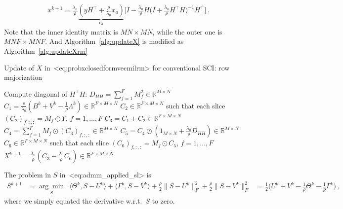 \documentclass[a4paper,11pt]{article}
\def\\{}%
\def\eqref#1{<#1>}%
\newcommand{\mypar}[1]{\bigskip\noindent {\bf #1.}}
\begin{document}
\begin{align}
  x^{k+1}
  =
  \frac{\lambda_0}{\rho}
  \underbrace{\left(y H^\top + \frac{\rho}{\lambda_0} x_a\right)}_{c_3}
  \bigg[
    I - \frac{\lambda_0}{\rho}
    H\big( I + \frac{\lambda_0}{\rho}H^\top H\big)^{-1}H^\top
  \bigg]\,.
  \label{eq:probxclosedformvecmilrm}
\end{align}
Note that the inner identity matrix is $MN \times MN$, while the outer one is
$MNF \times MNF$. And Algorithm~\ref{alg:updateX} is modified as
Algorithm~\ref{alg:updateXrm}
\begin{algorithm}
  \caption{Update of $X$ in~\eqref{eq:probxclosedformvecmilrm} for
  conventional SCI: row majorization}
  \label{alg:updateXrm}
  \begin{algorithmic}[1]
    \algrenewcommand{}
    \Require Compute diagonal of $H^\top H$: $D_{HH} = \sum_{f=1}^{F} M_f^2 \in \mathbb{R}^{M\times N}$
    \algrenewcommand{}
    \Require
    \State $C_1 = \frac{\rho}{\lambda_0} (B^k + V^k - \frac{1}{\rho}\Lambda^k) \in \mathbb{R}^{F\times M\times N}$
    \State $C_2 \in \mathbb{R}^{F\times M\times N}$ such that each slice
    $(C_2)_{f,:, :} = M_f \odot Y$, $f = 1, \ldots, F$
    \State $C_3 = C_1 + C_2 \in \mathbb{R}^{F\times M \times N}$
    \State $C_4 = \sum_{f=1}^{F} M_f \odot (C_3)_{f, :, :} \in \mathbb{R}^{M\times N}$
    \State $C_5 = C_4 \oslash (1_{M\times N} + \frac{\lambda_0}{\rho}D_{HH}) \in \mathbb{R}^{M\times N}$
    \label{subAlg:inversesteprm}
    \State $C_6 \in \mathbb{R}^{F\times M\times N}$ such that each slice
    $(C_6)_{f, :, :} = M_f \odot C_5$, $f = 1, \ldots, F$
    \State $X^{k+1} = \frac{\lambda_0}{\rho}(C_3 - \frac{\lambda_0}{\rho}C_6) \in \mathbb{R}^{F\times
    M\times N}$
  \end{algorithmic}
\end{algorithm}

\mypar{Updating $\bm{S}$}
The problem in $S$ in~\eqref{eq:admm_applied_sl} is
\begin{align*}
  S^{k+1} 
  &=
  \underset{S}{\arg\min} \,\,\,
  \langle\Theta^k, S - U^k\rangle
  +
  \langle\Gamma^k, S - V^k\rangle
  +
  \frac{\rho}{2}
  \|S - U^k\|_{F}^2
  +
  \frac{\rho}{2}
  \|S - V^k\|_{F}^2
  \\ 
  &=
  \frac{1}{2}
  \Big(U^k + V^k - \frac{1}{\rho}\Theta^k - \frac{1}{\rho}\Gamma^k\Big)\,,
\end{align*}
where we simply equated the derivative w.r.t.\ $S$ to zero. 
\end{document}
